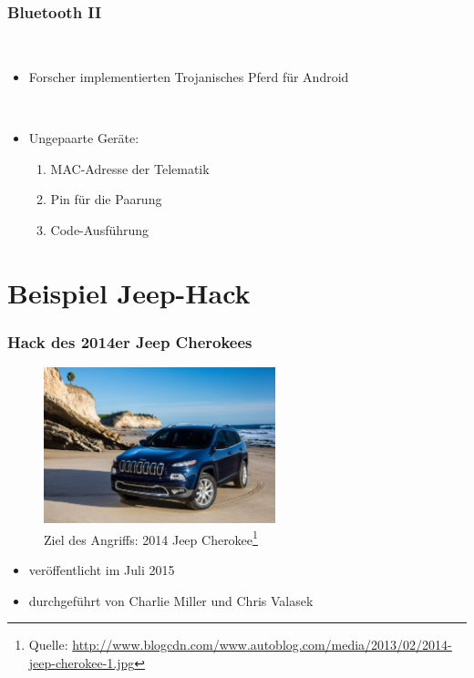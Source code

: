 \documentclass[t]{beamer}
\begin{document}
\begin{frame}
	\frametitle{Bluetooth II}
    \ \par
       \begin{itemize}
		\item Forscher implementierten Trojanisches Pferd für Android
	\end{itemize}
    \ \par
    \begin{itemize}
		\item Ungepaarte Geräte:
        \begin{enumerate}
			\item MAC-Adresse der Telematik
            \item Pin für die Paarung
            \item Code-Ausführung
		\end{enumerate}
	\end{itemize}
\end{frame}

\section{Beispiel Jeep-Hack}
\begin{frame}
	\frametitle{Hack des 2014er Jeep Cherokees}
	\begin{figure}
        \includegraphics[width=0.6\textwidth]{pic/2014-jeep-cherokee-1.jpg}
        \caption{Ziel des Angriffs: 2014 Jeep Cherokee\footnote{Quelle: \href{http://www.blogcdn.com/www.autoblog.com/media/2013/02/2014-jeep-cherokee-1.jpg}{http://www.blogcdn.com/www.autoblog.com/media/2013/02/2014-jeep-cherokee-1.jpg}} }
    \end{figure}
    \begin{itemize}
		\item veröffentlicht im Juli 2015
        \item durchgeführt von Charlie Miller und Chris Valasek
	\end{itemize}
\end{frame}
\end{document}
